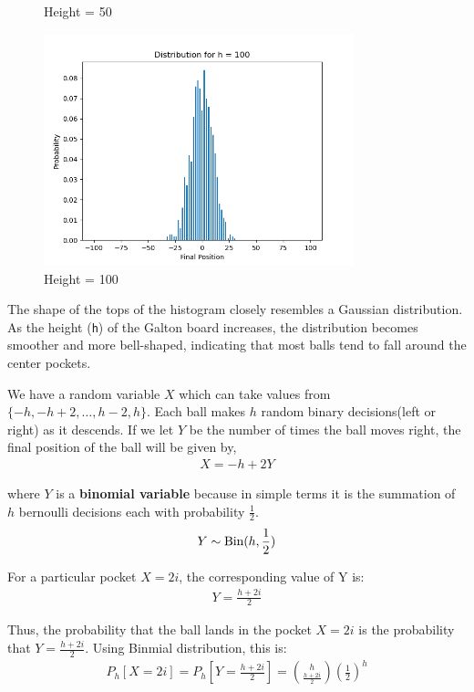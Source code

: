 \begin{solution}
\begin{figure}[H]
\begin{minipage}{0.5\textwidth}
			\caption{Height = 50}
		\end{minipage}\hfill
	\end{figure}
	\begin{figure}[H]
		\centering
		\includegraphics[width=0.8\textwidth]{../images/2d3.png}
		\caption{Height = 100}		
	\end{figure}

	The shape of the tops of the histogram closely resembles a Gaussian distribution. As the height (\texttt{h}) of the Galton board increases, the distribution becomes smoother and more bell-shaped, indicating that most balls tend to fall around the center pockets.

	We have a random variable $X$ which can take values from
	$\{-h,-h+2,\ldots,h-2,h\}$. Each ball makes $h$ random binary
	decisions(left or right) as it descends. If we let $Y$ be the number of
	times the ball moves right, the final position of the ball will be
	given by,
	\begin{align}
		X = -h+2Y
	\end{align}

	where $Y$ is a \textbf{binomial variable} because in simple terms it is the summation of $h$ bernoulli decisions each with probability $\frac{1}{2}$.
	\begin{align}
		Y \sim \text{Bin}(h,\frac{1}{2})
	\end{align}

	For a particular pocket $X = 2i$, the corresponding value of Y is:
	\begin{align}
		Y = \frac{h+2i}{2}
	\end{align}

	Thus, the probability that the ball lands in the pocket $X=2i$ is the
	probability that $Y = \frac{h+2i}{2}$. Using Binmial distribution, this
	is:
	\begin{align}
		P_h[X=2i]=P_h\left[Y=\frac{h+2i}{2}\right]=\binom{h}{\frac{h+2i}{2}}\left(\frac{1}{2}\right)^h
	\end{align}


\end{solution}
